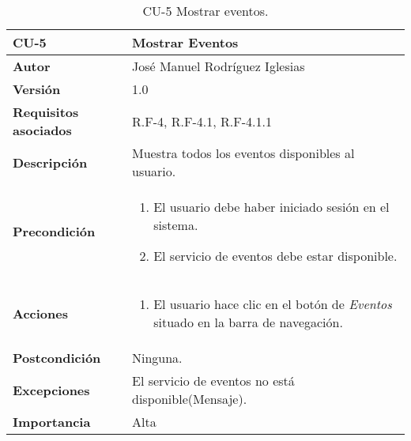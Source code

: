 \begin{table}[h]
	\centering
	\begin{tabularx}{\linewidth}{ p{} p{} }
		\toprule
		\textbf{CU-5}    & \textbf{Mostrar Eventos}\\
		\toprule
            \textbf{Autor}                & José Manuel Rodríguez Iglesias \\
		\textbf{Versión}              & 1.0    \\
		\textbf{Requisitos asociados} & R.F-4, R.F-4.1, R.F-4.1.1 \\
		\textbf{Descripción}          & Muestra todos los eventos disponibles al usuario. \\
		\textbf{Precondición}         &  
            \begin{enumerate}
			\def\labelenumi{\arabic{enumi}.}
			\tightlist
			\item El usuario debe haber iniciado sesión en el sistema.
			\item El servicio de eventos debe estar disponible.
		\end{enumerate}\\
    
  
		\textbf{Acciones}             &
		\begin{enumerate}
			\def\labelenumi{\arabic{enumi}.}
			\tightlist
			\item El usuario hace clic en el botón de\textit{ Eventos} situado en la barra de navegación.
		\end{enumerate}\\
		\textbf{Postcondición}        & Ninguna. \\
		\textbf{Excepciones}          & El servicio de eventos no está disponible(Mensaje).\\
		\textbf{Importancia}          & Alta\\
		\bottomrule
	\end{tabularx}
	\caption{CU-5 Mostrar eventos.}
\end{table}

